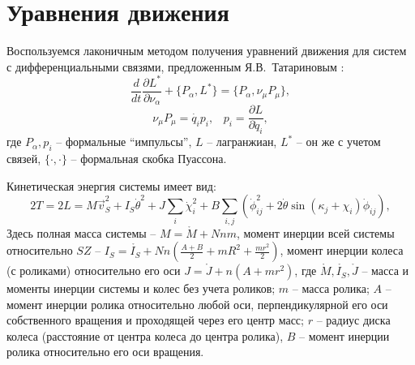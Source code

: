 \section{Уравнения движения}

Воспользуемся лаконичным методом получения уравнений движения для систем с дифференциальными связями, предложенным Я.В.~Татариновым \cite{Tatarinov}:
\begin{equation}\label{Tatarinov}
    \frac{d}{dt}\frac{\partial L^{*}}{\partial \nu_\alpha}  + \{P_\alpha, L^{*}\} = \{P_\alpha, \nu_\mu P_\mu\}, 
\end{equation}
$$\nu_\mu P_\mu = \dot{q_i} p_i, \hspace{10pt} p_i = \frac{\partial L}{\partial \dot{q}_i},$$
где $P_\alpha, p_i$ -- формальные ``импульсы'', $L$ -- лагранжиан, $L^*$ -- он же с учетом связей, $\{\cdot, \cdot\}$ -- формальная скобка Пуассона.

Кинетическая энергия системы имеет вид:
\begin{equation}\label{kin_en}
    2T = 2L = M\vec{v}_S^2 + I_S\dot{\theta}^2 + J\sum_i\dot{\chi}_i^2 + B\sum_{i,j}(\dot{\phi}_{ij}^2 + 2\dot{\theta}\sin(\kappa_j + \chi_i)\dot{\phi}_{ij}),
\end{equation}
Здесь полная масса системы -- $M = \mathring{M} + Nnm$, момент инерции всей системы относительно $SZ$ -- $I_S = \mathring{I_S} + Nn(\frac{A+B}{2} + mR^2 + \frac{mr^2}{2})$, момент инерции колеса (с роликами) относительно его оси $J = \mathring{J} + n(A + mr^2)$, где $\mathring{M}, \mathring{I_S}, \mathring{J}$ -- масса и моменты инерции системы и колес без учета роликов; $m$ -- масса ролика; $A$ -- момент инерции ролика относительно любой оси, перпендикулярной его оси собственного вращения и проходящей через его центр масс; $r$ -- радиус диска колеса (расстояние от центра колеса до центра ролика), $B$ -- момент инерции ролика относительно его оси вращения.

